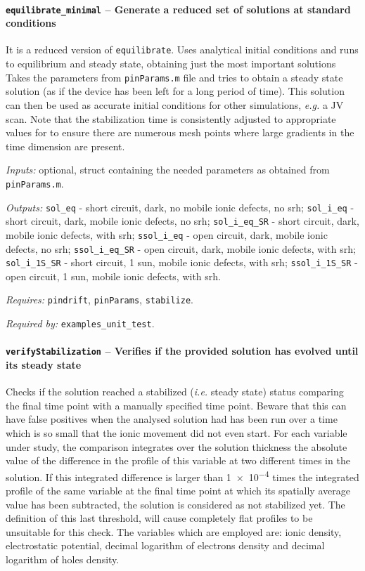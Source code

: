 \paragraph{\texttt{equilibrate\_minimal} -- Generate a reduced set of solutions at standard conditions}
It is a reduced version of \texttt{equilibrate}. 
Uses analytical initial conditions and runs to equilibrium and steady state, obtaining just the most important solutions
 Takes the parameters from \texttt{pinParams.m} file and tries
 to obtain a steady state solution (as if the device has been left for
 a long period of time). This solution can then be used as accurate
 initial conditions for other simulations, \textsl{e.g.} a JV scan.
 Note that the stabilization time is consistently adjusted to appropriate values for to
 ensure there are numerous mesh points where large gradients in the time
 dimension are present.
 
\textit{Inputs:} optional, struct containing the needed parameters as obtained
     from \texttt{pinParams.m}.
     
\textit{Outputs:} \texttt{sol\_eq} - short circuit, dark, no mobile ionic defects, no \gls{srh};
   \texttt{sol\_i\_eq} - short circuit, dark, mobile ionic defects, no \gls{srh};
   \texttt{sol\_i\_eq\_SR} - short circuit, dark, mobile ionic defects, with \gls{srh};
   \texttt{ssol\_i\_eq} - open circuit, dark, mobile ionic defects, no \gls{srh};
   \texttt{ssol\_i\_eq\_SR} - open circuit, dark, mobile ionic defects, with \gls{srh};
   \texttt{sol\_i\_1S\_SR} - short circuit, 1 sun, mobile ionic defects, with \gls{srh};
   \texttt{ssol\_i\_1S\_SR} - open circuit, 1 sun, mobile ionic defects, with \gls{srh}.

\textit{Requires:} \texttt{pindrift}, \texttt{pinParams}, \texttt{stabilize}.

\textit{Required by:} \texttt{examples\_unit\_test}.

		\paragraph{\texttt{verify\-Stabilization} -- Verifies if the provided solution has evolved until its steady state}\label{verifyStabilization}
Checks if the solution reached a stabilized (\textsl{i.e.} steady state) status comparing the final time point with a manually specified time point. Beware that this can have false positives when the analysed solution had
 has been run over a time which is so small that the ionic movement did not even start.
 For each variable under study, the comparison integrates over the solution thickness the absolute value of the difference in the profile of this variable at two different times in the solution.
 If this integrated difference is larger than \num{1e-4} times the integrated profile of the same variable at the final time point at which its spatially average value has been subtracted, the solution is considered as not stabilized yet.
 The definition of this last threshold, will cause completely flat profiles to be unsuitable for this check.
 The variables which are employed are: ionic density, electrostatic potential, decimal logarithm of electrons density and decimal logarithm of holes density.
 
